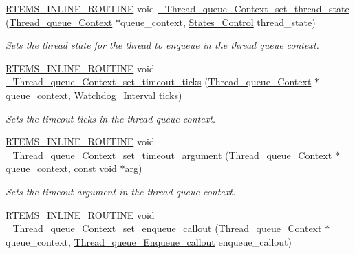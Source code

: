\begin{DoxyCompactItemize}
\mbox{\hyperlink{group__RTEMSScoreBaseDefs_gac216239df231d5dbd15e3520b0b9313f}{R\+T\+E\+M\+S\+\_\+\+I\+N\+L\+I\+N\+E\+\_\+\+R\+O\+U\+T\+I\+NE}} void \mbox{\hyperlink{group__RTEMSScoreThreadQueue_gab31678d367077d484797bc9c4d97574e}{\+\_\+\+Thread\+\_\+queue\+\_\+\+Context\+\_\+set\+\_\+thread\+\_\+state}} (\mbox{\hyperlink{structThread__queue__Context}{Thread\+\_\+queue\+\_\+\+Context}} $\ast$queue\+\_\+context, \mbox{\hyperlink{group__RTEMSScoreStates_gaeebbea0bfca162709b124fd519cf99d3}{States\+\_\+\+Control}} thread\+\_\+state)
\begin{DoxyCompactList}\small\item\em Sets the thread state for the thread to enqueue in the thread queue context. \end{DoxyCompactList}\item 
\mbox{\hyperlink{group__RTEMSScoreBaseDefs_gac216239df231d5dbd15e3520b0b9313f}{R\+T\+E\+M\+S\+\_\+\+I\+N\+L\+I\+N\+E\+\_\+\+R\+O\+U\+T\+I\+NE}} void \mbox{\hyperlink{group__RTEMSScoreThreadQueue_ga3c130c25dcaf90625f3787a31821c935}{\+\_\+\+Thread\+\_\+queue\+\_\+\+Context\+\_\+set\+\_\+timeout\+\_\+ticks}} (\mbox{\hyperlink{structThread__queue__Context}{Thread\+\_\+queue\+\_\+\+Context}} $\ast$queue\+\_\+context, \mbox{\hyperlink{group__RTEMSScoreWatchdog_gaa1834fd7531ca9bb5c4ca6fd990388d5}{Watchdog\+\_\+\+Interval}} ticks)
\begin{DoxyCompactList}\small\item\em Sets the timeout ticks in the thread queue context. \end{DoxyCompactList}\item 
\mbox{\hyperlink{group__RTEMSScoreBaseDefs_gac216239df231d5dbd15e3520b0b9313f}{R\+T\+E\+M\+S\+\_\+\+I\+N\+L\+I\+N\+E\+\_\+\+R\+O\+U\+T\+I\+NE}} void \mbox{\hyperlink{group__RTEMSScoreThreadQueue_gaacc8878446de7eef0f3c3f309fafe88c}{\+\_\+\+Thread\+\_\+queue\+\_\+\+Context\+\_\+set\+\_\+timeout\+\_\+argument}} (\mbox{\hyperlink{structThread__queue__Context}{Thread\+\_\+queue\+\_\+\+Context}} $\ast$queue\+\_\+context, const void $\ast$arg)
\begin{DoxyCompactList}\small\item\em Sets the timeout argument in the thread queue context. \end{DoxyCompactList}\item 
\mbox{\hyperlink{group__RTEMSScoreBaseDefs_gac216239df231d5dbd15e3520b0b9313f}{R\+T\+E\+M\+S\+\_\+\+I\+N\+L\+I\+N\+E\+\_\+\+R\+O\+U\+T\+I\+NE}} void \mbox{\hyperlink{group__RTEMSScoreThreadQueue_gae3eded5964733b953ab0a461a9d82f5d}{\+\_\+\+Thread\+\_\+queue\+\_\+\+Context\+\_\+set\+\_\+enqueue\+\_\+callout}} (\mbox{\hyperlink{structThread__queue__Context}{Thread\+\_\+queue\+\_\+\+Context}} $\ast$queue\+\_\+context, \mbox{\hyperlink{group__RTEMSScoreThreadQueue_ga3dd59055cd68c42978de9cd8e007ce1d}{Thread\+\_\+queue\+\_\+\+Enqueue\+\_\+callout}} enqueue\+\_\+callout)

\end{DoxyCompactItemize}
